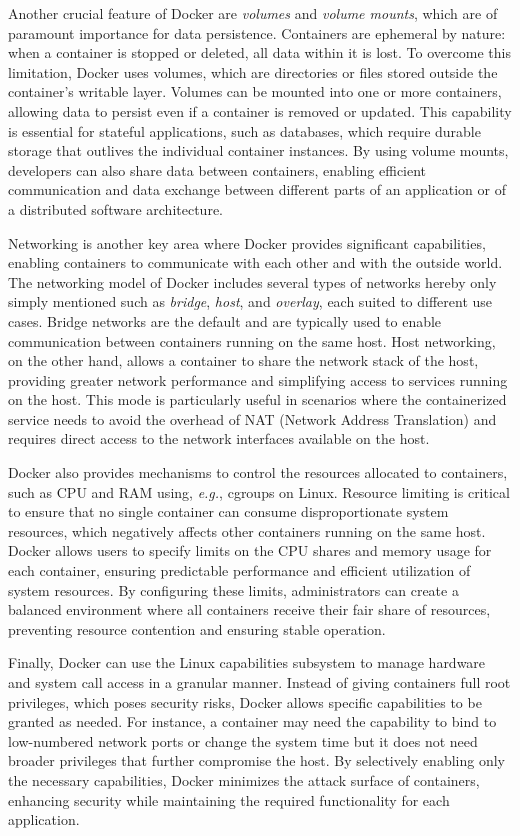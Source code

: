 Another crucial feature of Docker are \emph{volumes} and \emph{volume mounts}, which are of paramount importance for data persistence. Containers are ephemeral by nature: when a container is stopped or deleted, all data within it is lost. To overcome this limitation, Docker uses volumes, which are directories or files stored outside the container's writable layer. Volumes can be mounted into one or more containers, allowing data to persist even if a container is removed or updated. This capability is essential for stateful applications, such as databases, which require durable storage that outlives the individual container instances. By using volume mounts, developers can also share data between containers, enabling efficient communication and data exchange between different parts of an application or of a distributed software architecture.

Networking is another key area where Docker provides significant capabilities, enabling containers to communicate with each other and with the outside world. The networking model of Docker includes several types of networks hereby only simply mentioned such as \emph{bridge}, \emph{host}, and \emph{overlay}, each suited to different use cases. Bridge networks are the default and are typically used to enable communication between containers running on the same host. Host networking, on the other hand, allows a container to share the network stack of the host, providing greater network performance and simplifying access to services running on the host. This mode is particularly useful in scenarios where the containerized service needs to avoid the overhead of NAT (Network Address Translation) and requires direct access to the network interfaces available on the host.

Docker also provides mechanisms to control the resources allocated to containers, such as CPU and RAM using, \emph{e.g.}, cgroups on Linux. Resource limiting is critical to ensure that no single container can consume disproportionate system resources, which negatively affects other containers running on the same host. Docker allows users to specify limits on the CPU shares and memory usage for each container, ensuring predictable performance and efficient utilization of system resources. By configuring these limits, administrators can create a balanced environment where all containers receive their fair share of resources, preventing resource contention and ensuring stable operation.

Finally, Docker can use the Linux capabilities subsystem to manage hardware and system call access in a granular manner. Instead of giving containers full root privileges, which poses security risks, Docker allows specific capabilities to be granted as needed. For instance, a container may need the capability to bind to low-numbered network ports or change the system time but it does not need broader privileges that further compromise the host. By selectively enabling only the necessary capabilities, Docker minimizes the attack surface of containers, enhancing security while maintaining the required functionality for each application.

